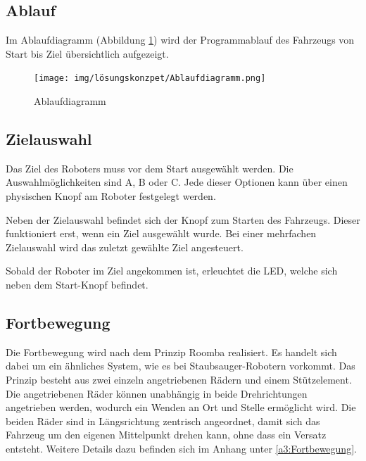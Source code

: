 \documentclass[../main.tex]{subfiles}
\begin{document}
\subsection{Ablauf}

Im Ablaufdiagramm (Abbildung \ref{img:ablaufdiagramm}) wird der Programmablauf des Fahrzeugs von Start bis Ziel übersichtlich aufgezeigt.

\begin{figure}[H]
\texttt{[image: img/lösungskonzpet/Ablaufdiagramm.png]}
\caption{Ablaufdiagramm}
\label{img:ablaufdiagramm}
\end{figure}

\newpage
\subsection{Zielauswahl}

Das Ziel des Roboters muss vor dem Start ausgewählt werden. Die Auswahlmöglichkeiten sind A, B oder C. Jede dieser Optionen kann über einen physischen Knopf am Roboter festgelegt werden.

Neben der Zielauswahl befindet sich der Knopf zum Starten des Fahrzeugs. Dieser funktioniert erst, wenn ein Ziel ausgewählt wurde. Bei einer mehrfachen Zielauswahl wird das zuletzt gewählte Ziel angesteuert.

Sobald der Roboter im Ziel angekommen ist, erleuchtet die LED, welche sich neben dem Start-Knopf befindet. 

\subsection{Fortbewegung} 

Die Fortbewegung wird nach dem Prinzip Roomba realisiert. Es handelt sich dabei um ein ähnliches System, wie es bei Staubsauger-Robotern vorkommt. Das Prinzip besteht aus zwei einzeln angetriebenen Rädern und einem Stützelement. Die angetriebenen Räder können unabhängig in beide Drehrichtungen angetrieben werden, wodurch ein Wenden an Ort und Stelle ermöglicht wird. Die beiden Räder sind in Längsrichtung zentrisch angeordnet, damit sich das Fahrzeug um den eigenen Mittelpunkt drehen kann, ohne dass ein Versatz entsteht. Weitere Details dazu befinden sich im Anhang unter \ref{a3:Fortbewegung}.
\end{document}
